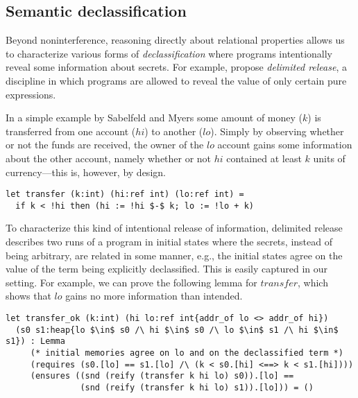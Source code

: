 \documentclass[sigplan,screen]{acmart}\settopmatter{}
\newcommand{\comm}[3]{\ifcheckpagebudget\else\ifdraft{\maybecolor{#1}[#2: #3]}\fi\fi}
\newcommand{\nig}[1]{\comm{dkgreen}{Niklas}{#1}}
\newcommand{\km}[1]{\comm{purple}{KM}{#1}}
\newcommand*{\ETC}{etc.\xspace}
\begin{document}

\iffull
\subsection{Semantic declassification}
\label{sec:declassification}

Beyond noninterference, reasoning directly about relational properties
allows us to characterize various forms of \emph{declassification}
where programs intentionally reveal some information about
secrets. For example, \citet{SabelfeldMyers03DL}
propose \emph{delimited release}, a discipline in which programs are
allowed to reveal the value of only certain pure expressions.

In a simple example by Sabelfeld and Myers
some amount of money (\ls$k$) is transferred
from one account (\ls$hi$) to another (\ls$lo$). Simply by
observing whether or not the funds are received, the owner of the
\ls$lo$ account gains some information about the other account, namely
whether or not \ls$hi$ contained at least \ls$k$ units of
currency---this is, however, by design.

\begin{lstlisting}
let transfer (k:int) (hi:ref int) (lo:ref int) = 
  if k < !hi then (hi := !hi $-$ k; lo := !lo + k)
\end{lstlisting}

To characterize this kind of intentional release of information,
delimited release describes two runs of a
program in initial states where the secrets, instead of being
arbitrary, are related in some manner, e.g., the initial states
agree on the value of the term being explicitly declassified. This is
easily captured in our setting. For example, we can prove the
following lemma for \ls$transfer$, which shows that \ls$lo$ gains no
more information than intended.


\begin{lstlisting}
let transfer_ok (k:int) (hi lo:ref int{addr_of lo <> addr_of hi}) 
  (s0 s1:heap{lo $\in$ s0 /\ hi $\in$ s0 /\ lo $\in$ s1 /\ hi $\in$ s1}) : Lemma
     (* initial memories agree on lo and on the declassified term *)
     (requires (s0.[lo] == s1.[lo] /\ (k < s0.[hi] <==> k < s1.[hi]))) 
     (ensures ((snd (reify (transfer k hi lo) s0)).[lo] == 
               (snd (reify (transfer k hi lo) s1)).[lo])) = ()
\end{lstlisting}
\end{document}
